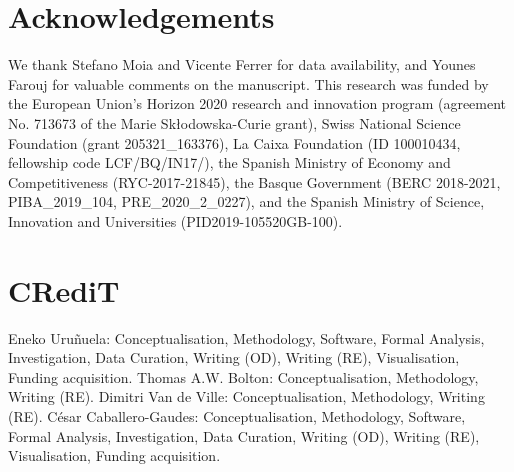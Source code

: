 \documentclass[preprint]{elsarticle}
\begin{document}
\section{Acknowledgements}
We thank Stefano Moia and Vicente Ferrer for data availability, and Younes Farouj for valuable comments on the manuscript. This research was funded by the European Union’s Horizon 2020 research and innovation program (agreement No. 713673 of the Marie Skłodowska-Curie grant), Swiss National Science Foundation (grant 205321\_163376), La Caixa Foundation (ID 100010434, fellowship code LCF/\-BQ/\-IN17/), the Spanish Ministry of Economy and Competitiveness (RYC-2017-21845), the Basque Government (BERC 2018-2021, PIBA\_2019\_104, PRE\_2020\_2\_0227), and the Spanish Ministry of Science, Innovation and Universities (PID2019-105520GB-100).

\section{CRediT}
Eneko Uru\~nuela: Conceptualisation, Methodology, Software, Formal Analysis, Investigation, Data Curation, Writing (OD), Writing (RE), Visualisation, Funding acquisition. Thomas A.W. Bolton: Conceptualisation, Methodology, Writing (RE). Dimitri Van de Ville: Conceptualisation, Methodology, Writing (RE). C\'{e}sar Caballero-Gaudes: Conceptualisation, Methodology, Software, Formal Analysis, Investigation, Data Curation, Writing (OD), Writing (RE), Visualisation, Funding acquisition.



\newpage

\end{document}
